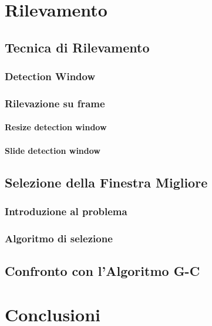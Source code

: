 
\chapter{Rilevamento}
\label{chap:rilevamento}
    \section{Tecnica di Rilevamento}
    \label{sec:detection_tecnique}
        \subsection{Detection Window}
        \subsection{Rilevazione su frame}
            \subsubsection{Resize detection window}
            \subsubsection{Slide detection window}
    \section{Selezione della Finestra Migliore} %
    \label{sec:best_detection_window}
        \subsection{Introduzione al problema}
        \subsection{Algoritmo di selezione}
    \section{Confronto con l'Algoritmo G-C} %
    \label{sec:gc_algorithm_comparison}

\chapter{Conclusioni}

